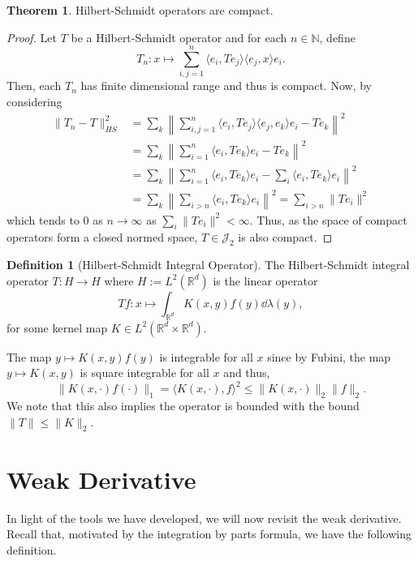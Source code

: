 \documentclass[]{article}
\theoremstyle{definition}
\newtheorem{theorem}{Theorem}
\theoremstyle{definition}
\newtheorem{definition}{Definition}[section]
\begin{document}
\begin{theorem}
  Hilbert-Schmidt operators are compact.
\end{theorem}
\begin{proof}
  Let \(T\) be a Hilbert-Schmidt operator and for each \(n \in \mathbb{N}\), 
  define 
  \[T_n : x \mapsto 
    \sum_{i, j = 1}^n \langle e_i, Te_j\rangle \langle e_j, x\rangle e_i.\]
  Then, each \(T_n\) has finite dimensional range and thus is compact.
  Now, by considering 
  \[\begin{split}
    \|T_n - T\|^2_{HS} & = \sum_k \left\|\sum_{i, j = 1}^n 
    \langle e_i, Te_j\rangle \langle e_j, e_k\rangle e_i - Te_k\right\|^2\\
    & = \sum_k \left\|\sum_{i = 1}^n 
    \langle e_i, Te_k\rangle e_i - Te_k\right\|^2\\
    & = \sum_k \left\|\sum_{i = 1}^n 
    \langle e_i, Te_k\rangle e_i - \sum_i \langle e_i, Te_k\rangle e_i\right\|^2\\
    & = \sum_k \left\|\sum_{i > n} \langle e_i, Te_k\rangle e_i\right\|^2
      = \sum_{i > n}\|Te_i\|^2
  \end{split}\]
  which tends to 0 as \(n \to \infty\) as \(\sum_i\|Te_i\|^2 < \infty\). Thus, 
  as the space of compact operators form a closed normed space, \(T \in \mathcal{J}_2\) 
  is also compact.
\end{proof}

\begin{definition}[Hilbert-Schmidt Integral Operator]
  The Hilbert-Schmidt integral operator \(T : H \to H\) where 
  \(H := L^2(\mathbb{R}^d)\) is the linear operator 
  \[Tf : x \mapsto \int_{\mathbb{R}^d} K(x, y) f(y) \dd \lambda(y),\]
  for some kernel map \(K \in L^2(\mathbb{R}^d \times \mathbb{R}^d)\).
\end{definition}

The map \(y \mapsto K(x, y)f(y)\) is integrable for all \(x\) since by 
Fubini, the map \(y \mapsto K(x, y)\) is square integrable for all \(x\) 
and thus, 
\[\|K(x, \cdot)f(\cdot)\|_1 = \langle K(x, \cdot), f \rangle^2 \le 
  \|K(x, \cdot)\|_2 \|f\|_2.\]
We note that this also implies the operator is bounded with the bound 
\(\|T\| \le \|K\|_2\).

\newpage
\section{Weak Derivative}

In light of the tools we have developed, we will now revisit the weak derivative. 
Recall that, motivated by the integration by parts formula, we have the following 
definition.
\end{document}
